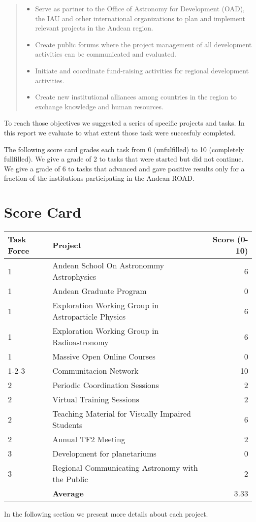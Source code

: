 \begin{quote}
\begin{itemize}
\item Serve as partner to the Office of Astronomy for Development (OAD),
the IAU and other international organizations to plan and implement
relevant projects in the Andean region. 
\item Create public forums where the project management of all
development activities can be communicated and evaluated. 
\item Initiate and coordinate fund-raising activities for regional
development activities. 
\item Create new institutional alliances among countries in the region
to exchange knowledge and human resources. 

\end{itemize}

\end{quote} 

To reach those objectives we suggested a series of specific projects and tasks. 
In this report we evaluate to what extent those task were succesfuly
completed.

The following score card grades each task from 0 (unfulfilled) to 10
(completely fullfilled). We give a grade of $2$ to tasks that were
started but did not continue. We give a grade of $6$ to tasks that
advanced and gave positive results only for a fraction of the
institutions participating in the Andean ROAD.

\section{Score Card}

\begin{table}[!h]
\begin{center}
\begin{tabular}{lp{9cm}r}
Task Force & Project & Score (0-10)\\\hline
1 & Andean School On Astronommy Astrophysics & 6\\
1 & Andean Graduate Program & 0 \\
1 & Exploration Working Group in Astroparticle Physics & 6\\
1 & Exploration Working Group in Radioastronomy & 6\\
1 & Massive Open Online Courses & 0 \\ 
1-2-3 & Communitacion Network & 10\\
2  & Periodic Coordination Sessions & 2\\
2 & Virtual Training Sessions & 2\\
2 & Teaching Material for Visually Impaired Students & 6\\
2 & Annual TF2 Meeting & 2\\
3 & Development for planetariums & 0\\
3 & Regional Communicating Astronomy with the Public & 2\\\hline
 & \textbf{Average} & 3.33\\ 
\end{tabular}
\end{center}

In the following section we present more details about each project.
\end{table}


